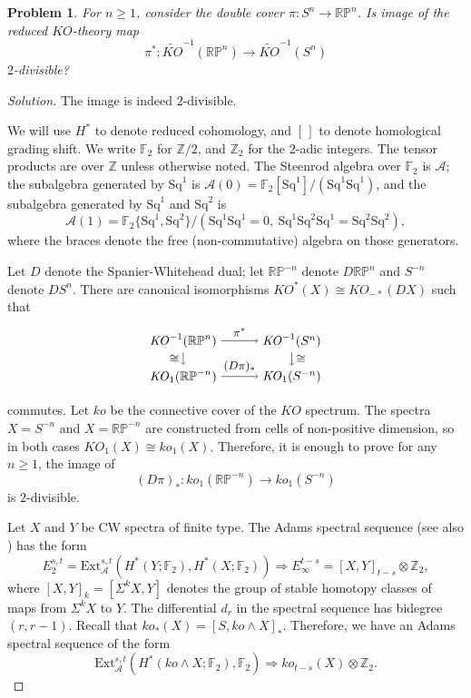 \documentclass{amsart}
\newtheorem*{problem*}{Problem}
\def\Z {\mathbb{Z}}
\def\RP{\mathbb{RP}}
\def\KO{\mathit{KO}}
\def\ko{\mathit{ko}}
\newcommand{\from}{\colon}
\newcommand{\Ext}{\mathrm{Ext}}
\newcommand{\Steenrod}{\mathcal{A}}
\newcommand{\Aone}{\Steenrod(1)}
\newcommand{\Azero}{\Steenrod(0)}
\newcommand{\FF}{\mathbb{F}}
\newcommand{\ZZ}{\mathbb{Z}}
\newcommand{\smas}{\wedge}
\newcommand{\Sq}{\mathrm{Sq}}
\begin{document}
\begin{problem*}
  For $n \geq 1$, consider the double cover $\pi\from S^n \to \RP^n$. Is image of the reduced $\KO$-theory map
  \[
  \pi^*\from \tilde{\KO}^{-1}(\RP^n) \to \tilde{\KO}^{-1}(S^n)
  \]
  $2$-divisible?
\end{problem*}


\begin{proof}[Solution]
  The image is indeed $2$-divisible.


  We will use $H^*$ to denote reduced cohomology, and $[\,]$ to denote
  homological grading shift. We write $\FF_2$ for $\ZZ/2$, and $\ZZ_2$
  for the $2$-adic integers. The tensor products are over $\Z$ unless
  otherwise noted. The Steenrod algebra over $\FF_2$ is $\Steenrod$;
  the subalgebra generated by $\Sq^1$ is
  $\Azero=\FF_2[\Sq^1]/(\Sq^1\Sq^1)$, and the subalgebra generated by
  $\Sq^1$ and $\Sq^2$ is
  \[
    \Aone = \FF_2\{\Sq^1, \Sq^2\} / (\Sq^1 \Sq^1=0, \ \Sq^1 \Sq^2 \Sq^1 = \Sq^2 \Sq^2),
  \]
  where the braces denote the free (non-commutative) algebra on those generators. 

  
  Let $D$ denote the Spanier-Whitehead dual; let $\RP^{-n}$ denote
  $D\RP^n$ and $S^{-n}$ denote $DS^n$. There are canonical
  isomorphisms $\KO^*(X)\cong \KO_{-*}(DX)$ such that
  \[
    \begin{tikzpicture}[xscale=3]
      \node (dr) at (0,0) {$\KO_{1}(\RP^{-n})$};
      \node (ds) at (1,0) {$\KO_{1}(S^{-n})$};
      \node (r) at (0,1) {$\KO^{-1}(\RP^n)$};
      \node (s) at (1,1) {$\KO^{-1}(S^n)$};
      
      \draw[->] (dr) -- (ds) node[pos=0.5, anchor=south] {\small $(D\pi)_*$};
      \draw[->] (r) -- (s) node[pos=0.5, anchor=south] {\small $\pi^*$};
      \draw[->] (r) -- (dr) node[pos=0.5,anchor=east] {\small $\cong$};
      \draw[->] (s) -- (ds) node[pos=0.5,anchor=west] {\small $\cong$};
    \end{tikzpicture}
  \]
  commutes.  Let $ko$ be the connective cover of the $\KO$
  spectrum. The spectra $X = S^{-n}$ and $X=\RP^{-n}$ are constructed
  from cells of non-positive dimension, so in both cases
  $\KO_1(X) \cong ko_1(X)$. Therefore, it is enough to prove for any
  $n\geq 1$, the image of
  \begin{equation}\label{eq:dual-main}
    (D\pi)_*\from ko_1(\RP^{-n}) \to ko_1(S^{-n})
  \end{equation}
  is $2$-divisible.


  
Let $X$ and $Y$ be CW spectra of finite type.
The Adams spectral sequence \cite{Adams, Brinkmann} (see also \cite{RognesNotes})
has the form
\begin{equation}
  E_2^{s, t}=\Ext^{s,t}_\Steenrod(H^*(Y;\FF_2),H^*(X;\FF_2))\Rightarrow   E_{\infty}^{t-s} = [X, Y]_{t-s} \otimes \ZZ_2,
\end{equation}
where $[X, Y]_k = [\Sigma^k X, Y]$ denotes the group of stable
homotopy classes of maps from $\Sigma^k X$ to $Y$. The differential
$d_r$ in the spectral sequence has bidegree $(r, r-1)$. Recall that
$ko_*(X)=[S,\ko \smas X]_*$. Therefore, we have an Adams spectral
sequence of the form
\[
\Ext^{s,t}_\Steenrod(H^*(\ko \smas X;\FF_2),\FF_2)\Rightarrow ko_{t-s}(X) \otimes \ZZ_2.
\]
 

\end{proof}
\end{document}
